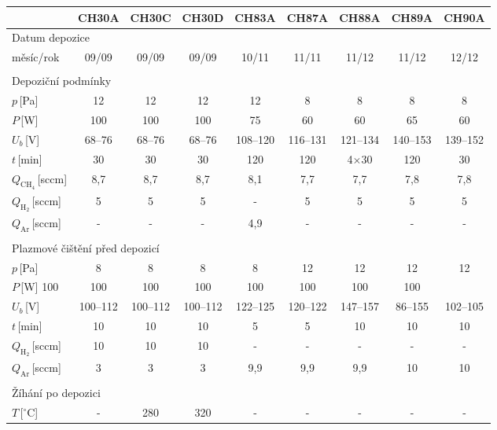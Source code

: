 \begin{tabular}{lcccccccc}
\hline
 & CH30A & CH30C & CH30D & CH83A & CH87A & CH88A & CH89A & CH90A\\
\hline
\multicolumn{9}{l}{Datum depozice}\\
měsíc/rok & 09/09 & 09/09 & 09/09 & 10/11 & 11/11 & 11/12 & 11/12 & 12/12 \\
\hline

\multicolumn{9}{l}{}\\
\multicolumn{9}{l}{Depoziční podmínky}\\
\hline
$p$\,[Pa] & 12 & 12 & 12 & 12 & 8 & 8 & 8 & 8\\
$P$\,[W] & 100 & 100 & 100 & 75 & 60 & 60 & 65 & 60\\ 
$U_b$\,[V] & 68--76 & 68--76 & 68--76 & 108--120 & 116--131 & 121--134 & 140--153 & 139--152\\
$t$\,[min] & 30 & 30 & 30 & 120 & 120 & 4$\times$30 & 120 & 30\\
$Q_{\mathrm{CH_4}}$\,[sccm] & 8,7 & 8,7 & 8,7 & 8,1 & 7,7 & 7,7 & 7,8 & 7,8\\
$Q_\mathrm{H_2}$\,[sccm] & 5 & 5 & 5 & - & 5 & 5 & 5 & 5\\
$Q_\mathrm{Ar}$\,[sccm] & - & - & - & 4,9 & - & - & - & -\\

\multicolumn{9}{l}{}\\
\multicolumn{9}{l}{Plazmové čištění před depozicí}\\
\hline
$p$\,[Pa] & 8 & 8 & 8 & 8 & 12 & 12 & 12 & 12\\
$P$\,[W] 100 & 100 & 100 & 100 & 100 & 100 & 100 & 100\\ 
$U_b$\,[V] & 100--112 & 100--112 & 100--112 & 122--125 & 120--122 & 147--157 & 86--155 & 102--105\\
$t$\,[min] & 10 & 10 & 10 & 5 & 5 & 10 & 10 & 10\\
$Q_\mathrm{H_2}$\,[sccm]  & 10 & 10 & 10 & - & - & - & - & -\\
$Q_\mathrm{Ar}$\,[sccm]  & 3 & 3 & 3 & 9,9 & 9,9 & 9,9 & 10 & 10\\ 

\multicolumn{9}{l}{}\\
\multicolumn{9}{l}{Žíhání po depozici}\\
$T$\,[$^\circ$C] & - & 280 & 320 & - & - & - & - & -\\
\hline
\hline

\end{tabular}
